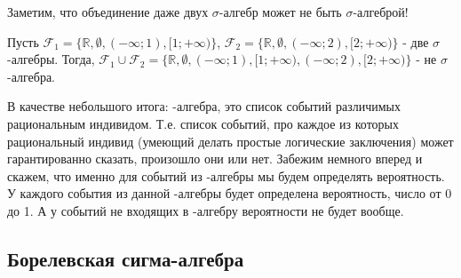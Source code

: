 {Заметим, что объединение даже двух $\sigma$-алгебр может не быть $\sigma$-алгеброй! 

\begin{myex} Пусть $\mathcal{F}_{1}=\{\mathbb{R},\emptyset,(-\infty;1),[1;+\infty)\}$, $\mathcal{F}_{2}=\{\mathbb{R},\emptyset,(-\infty;2),[2;+\infty)\}$ - две $\sigma$-алгебры. Тогда, $\mathcal{F}_{1}\cup \mathcal{F}_{2}=\{\mathbb{R},\emptyset,(-\infty;1),[1;+\infty),(-\infty;2),[2;+\infty)\}$ - не $\sigma$-алгебра.
\end{myex}


В качестве небольшого итога: \s-алгебра, это список событий различимых рациональным индивидом. Т.е. список событий, про каждое из которых рациональный индивид (умеющий делать простые логические заключения) может гарантированно сказать, произошло они или нет. Забежим немного вперед и скажем, что именно для событий из \s-алгебры мы будем определять вероятность. У каждого события из данной \s-алгебры \F будет определена вероятность, число от 0 до 1. А у событий не входящих в \s-алгебру \F вероятности не будет вообще.







}\subsection{Борелевская сигма-алгебра} 
